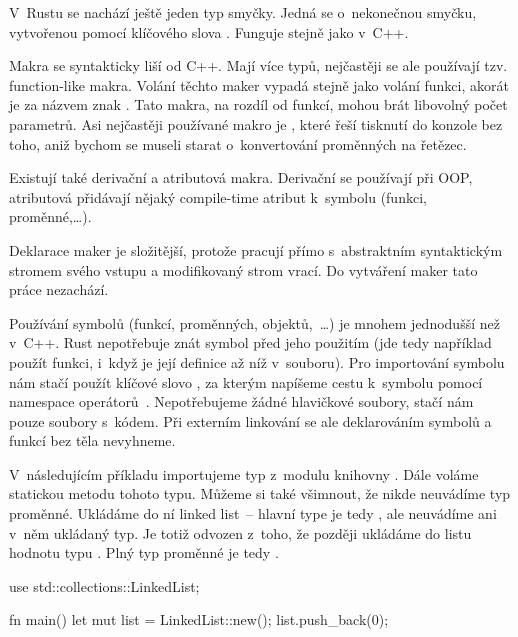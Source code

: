 \documentclass[main.tex]{subfiles}
\begin{document}

V~Rustu se nachází ještě jeden typ smyčky. Jedná se o~nekonečnou smyčku, vytvořenou
pomocí klíčového slova . Funguje stejně jako  v~C++.


Makra se syntakticky liší od C++. Mají více typů, nejčastěji se ale používají tzv.
function-like makra. Volání těchto maker vypadá stejně jako volání funkci, akorát je za
názvem znak \irust{!}. Tato makra, na rozdíl od funkcí, mohou brát libovolný počet
parametrů. Asi nejčastěji používané makro je , které řeší tisknutí do
konzole bez toho, aniž bychom se museli starat o~konvertování proměnných na řetězec.

Existují také derivační a atributová makra. Derivační se používají při OOP, atributová
přidávají nějaký compile-time atribut k~symbolu (funkci, proměnné,\dots).
\cite[sekce 19.5]{thebook}

Deklarace maker je složitější, protože pracují přímo s~abstraktním syntaktickým stromem
svého vstupu a modifikovaný strom vrací. Do vytváření maker tato práce nezachází.


Používání symbolů (funkcí, proměnných, objektů,~\dots) je mnohem jednodušší než v~C++.
Rust nepotřebuje znát symbol před jeho použitím (jde tedy například použít funkci, i~když
je její definice až níž v~souboru). Pro importování symbolu nám stačí použít klíčové slovo
, za kterým napíšeme cestu k~symbolu pomocí namespace operátorů~\irust{::}.
Nepotřebujeme žádné hlavičkové soubory, stačí nám pouze soubory s~kódem.
\cite[/keyword.use]{ruststd} Při externím linkování se ale deklarováním symbolů a funkcí
bez těla nevyhneme. \cite[/keyword.extern]{ruststd}

V~následujícím příkladu importujeme typ  z~modulu 
knihovny . Dále voláme statickou metodu  tohoto typu. Můžeme si také
všimnout, že nikde neuvádíme typ proměnné. Ukládáme do ní  linked list~-- hlavní
type je tedy , ale neuvádíme ani v~něm ukládaný typ. Je totiž odvozen
z~toho, že později ukládáme do listu hodnotu typu . Plný typ proměnné
 je tedy .

\obrazek
\begin{rustcode}
    use std::collections::LinkedList;

    fn main() {
        let mut list = LinkedList::new();
        list.push_back(0);
    }
\end{rustcode}
\end{document}
